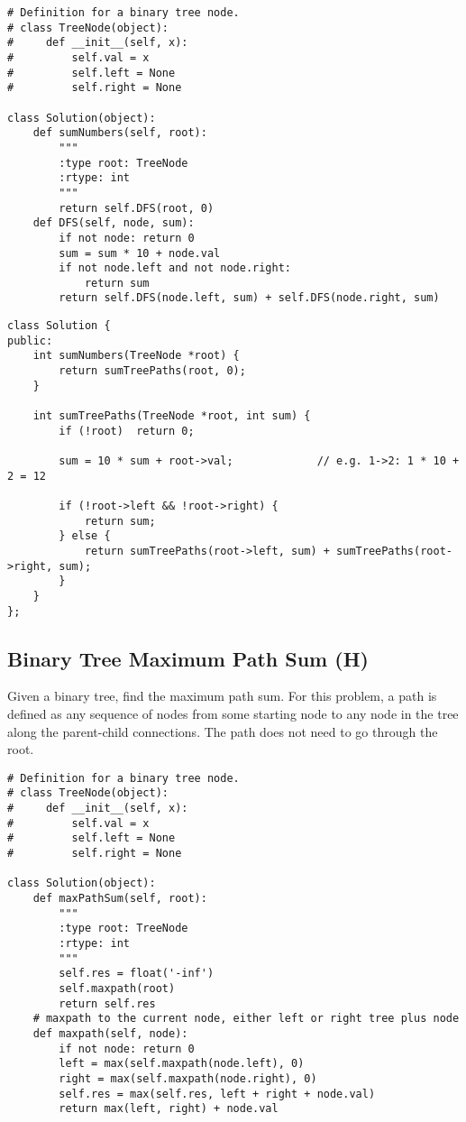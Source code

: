 \begin{lstlisting}
# Definition for a binary tree node.
# class TreeNode(object):
#     def __init__(self, x):
#         self.val = x
#         self.left = None
#         self.right = None

class Solution(object):
    def sumNumbers(self, root):
        """
        :type root: TreeNode
        :rtype: int
        """
        return self.DFS(root, 0)
    def DFS(self, node, sum):
        if not node: return 0
        sum = sum * 10 + node.val
        if not node.left and not node.right:
            return sum
        return self.DFS(node.left, sum) + self.DFS(node.right, sum)                
\end{lstlisting}


\begin{lstlisting}
class Solution {
public:
    int sumNumbers(TreeNode *root) {
        return sumTreePaths(root, 0);
    }
    
    int sumTreePaths(TreeNode *root, int sum) {
        if (!root)  return 0;
        
        sum = 10 * sum + root->val;             // e.g. 1->2: 1 * 10 + 2 = 12
        
        if (!root->left && !root->right) {
            return sum;
        } else {
            return sumTreePaths(root->left, sum) + sumTreePaths(root->right, sum);
        }
    }
};
\end{lstlisting}


\subsection{Binary Tree Maximum Path Sum (H)}
Given a binary tree, find the maximum path sum. For this problem, a path is defined as any sequence of nodes from some starting node to any node in the tree along the parent-child connections. The path does not need to go through the root. \\

\begin{lstlisting}
# Definition for a binary tree node.
# class TreeNode(object):
#     def __init__(self, x):
#         self.val = x
#         self.left = None
#         self.right = None

class Solution(object):
    def maxPathSum(self, root):
        """
        :type root: TreeNode
        :rtype: int
        """
        self.res = float('-inf')
        self.maxpath(root)
        return self.res
    # maxpath to the current node, either left or right tree plus node
    def maxpath(self, node):
        if not node: return 0
        left = max(self.maxpath(node.left), 0)
        right = max(self.maxpath(node.right), 0)
        self.res = max(self.res, left + right + node.val)
        return max(left, right) + node.val
\end{lstlisting}
        
